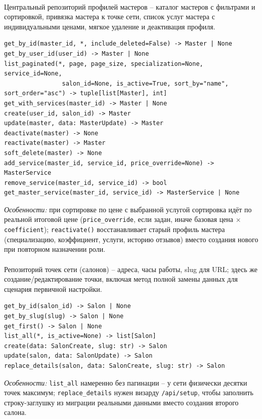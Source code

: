 \paragraph{}
Центральный репозиторий профилей мастеров -- каталог мастеров с
фильтрами и сортировкой, привязка мастера к точке сети, список услуг
мастера с индивидуальными ценами, мягкое удаление и деактивация профиля.
\begin{verbatim}
get_by_id(master_id, *, include_deleted=False) -> Master | None
get_by_user_id(user_id) -> Master | None
list_paginated(*, page, page_size, specialization=None, service_id=None,
                salon_id=None, is_active=True, sort_by="name", sort_order="asc") -> tuple[list[Master], int]
get_with_services(master_id) -> Master | None
create(user_id, salon_id) -> Master
update(master, data: MasterUpdate) -> Master
deactivate(master) -> None
reactivate(master) -> Master
soft_delete(master) -> None
add_service(master_id, service_id, price_override=None) -> MasterService
remove_service(master_id, service_id) -> bool
get_master_service(master_id, service_id) -> MasterService | None
\end{verbatim}
\textit{Особенности:} при сортировке по цене с выбранной услугой
сортировка идёт по реальной итоговой цене (\texttt{price_override},
если задан, иначе базовая цена $\times$ \texttt{coefficient});
\texttt{reactivate()} восстанавливает старый профиль мастера
(специализацию, коэффициент, услуги, историю отзывов) вместо создания
нового при повторном назначении роли.

\paragraph{}
Репозиторий точек сети (салонов) -- адреса, часы работы, slug для URL;
здесь же создание/редактирование точки, включая метод полной замены
данных для сценария первичной настройки.
\begin{verbatim}
get_by_id(salon_id) -> Salon | None
get_by_slug(slug) -> Salon | None
get_first() -> Salon | None
list_all(*, is_active=None) -> list[Salon]
create(data: SalonCreate, slug: str) -> Salon
update(salon, data: SalonUpdate) -> Salon
replace_details(salon, data: SalonCreate, slug: str) -> Salon
\end{verbatim}
\textit{Особенности:} \texttt{list_all} намеренно без пагинации -- у
сети физически десятки точек максимум; \texttt{replace_details} нужен
визарду \texttt{/api/setup}, чтобы заполнить строку-заглушку из миграции
реальными данными вместо создания второго салона.

